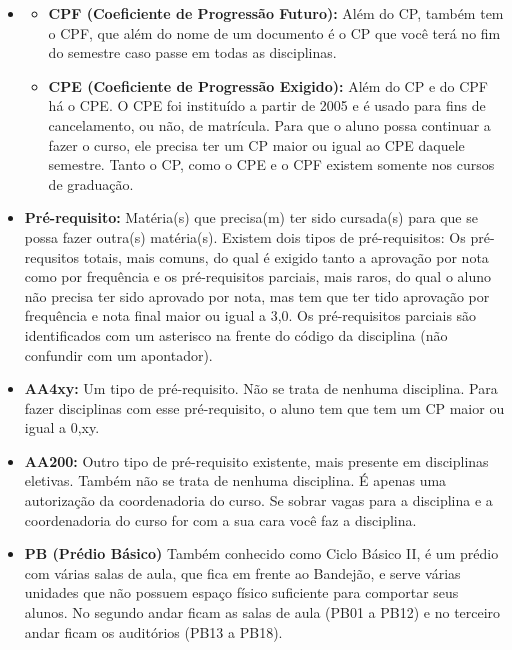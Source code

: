 \begin{itemize}
    \item   \begin{itemize}
            \item  \textbf{CPF (Coeficiente de Progressão Futuro):} Além do CP,
            também tem o CPF, que além do nome de um documento é o CP que você
            terá no fim do semestre caso passe em todas as disciplinas.
            \item  \textbf{CPE (Coeficiente de Progressão Exigido):} Além do CP
            e do CPF há o CPE. O CPE foi instituído a partir de 2005 e é usado
            para fins de cancelamento, ou não, de matrícula. Para que o aluno
            possa continuar a fazer o curso, ele precisa ter um CP maior ou
            igual ao CPE daquele semestre. Tanto o CP, como o CPE e o CPF
            existem somente nos cursos de graduação.
            \end{itemize}

    \item  \textbf{Pré-requisito:} Matéria(s) que precisa(m) ter sido cursada(s)
    para que se possa fazer outra(s) matéria(s). Existem dois tipos de
    pré-requisitos: Os pré-requsitos totais, mais comuns, do qual é exigido
    tanto a aprovação por nota como por frequência e os pré-requisitos parciais,
    mais raros, do qual o aluno não precisa ter sido aprovado por nota, mas tem
    que ter tido aprovação por frequência e nota final maior ou igual a 3,0. Os
    pré-requisitos parciais são identificados com um asterisco na frente do
    código da disciplina (não confundir com um apontador).

    \item  \textbf{AA4xy:} Um tipo de pré-requisito. Não se trata de nenhuma
    disciplina. Para fazer disciplinas com esse pré-requisito, o aluno tem que
    tem um CP maior ou igual a 0,xy.

    \item  \textbf{AA200:} Outro tipo de pré-requisito existente, mais presente
    em disciplinas eletivas. Também não se trata de nenhuma disciplina. É apenas
    uma autorização da coordenadoria do curso. Se sobrar vagas para a disciplina
    e a coordenadoria do curso for com a sua cara você faz a disciplina.

    \item  \textbf{PB (Prédio Básico)} Também conhecido como Ciclo Básico II,
    é um prédio com várias salas de aula, que fica em frente ao Bandejão,
    e serve várias unidades que não possuem espaço físico suficiente para
    comportar seus alunos. No segundo andar ficam as salas de aula (PB01 a PB12)
    e no terceiro andar ficam os auditórios (PB13 a PB18).


\end{itemize}
